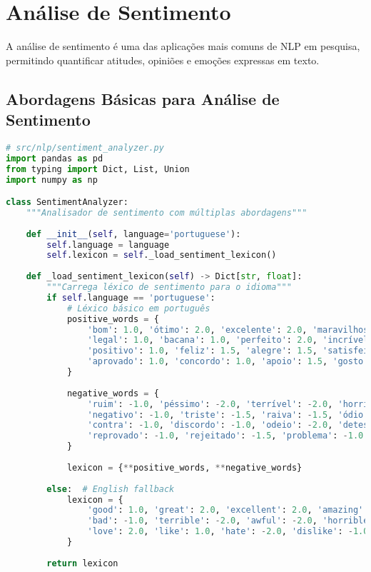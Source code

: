 \section{Análise de Sentimento}

A análise de sentimento é uma das aplicações mais comuns de NLP em pesquisa, permitindo quantificar atitudes, opiniões e emoções expressas em texto.

\subsection{Abordagens Básicas para Análise de Sentimento}

\begin{pythonbox}
\begin{lstlisting}[language=Python]
# src/nlp/sentiment_analyzer.py
import pandas as pd
from typing import Dict, List, Union
import numpy as np

class SentimentAnalyzer:
    """Analisador de sentimento com múltiplas abordagens"""
    
    def __init__(self, language='portuguese'):
        self.language = language
        self.lexicon = self._load_sentiment_lexicon()
        
    def _load_sentiment_lexicon(self) -> Dict[str, float]:
        """Carrega léxico de sentimento para o idioma"""
        if self.language == 'portuguese':
            # Léxico básico em português
            positive_words = {
                'bom': 1.0, 'ótimo': 2.0, 'excelente': 2.0, 'maravilhoso': 2.0,
                'legal': 1.0, 'bacana': 1.0, 'perfeito': 2.0, 'incrível': 2.0,
                'positivo': 1.0, 'feliz': 1.5, 'alegre': 1.5, 'satisfeito': 1.0,
                'aprovado': 1.0, 'concordo': 1.0, 'apoio': 1.5, 'gosto': 1.0
            }
            
            negative_words = {
                'ruim': -1.0, 'péssimo': -2.0, 'terrível': -2.0, 'horrível': -2.0,
                'negativo': -1.0, 'triste': -1.5, 'raiva': -1.5, 'ódio': -2.0,
                'contra': -1.0, 'discordo': -1.0, 'odeio': -2.0, 'detesto': -2.0,
                'reprovado': -1.0, 'rejeitado': -1.5, 'problema': -1.0
            }
            
            lexicon = {**positive_words, **negative_words}
            
        else:  # English fallback
            lexicon = {
                'good': 1.0, 'great': 2.0, 'excellent': 2.0, 'amazing': 2.0,
                'bad': -1.0, 'terrible': -2.0, 'awful': -2.0, 'horrible': -2.0,
                'love': 2.0, 'like': 1.0, 'hate': -2.0, 'dislike': -1.0
            }
            
        return lexicon
    \end{lstlisting}
\end{pythonbox}
